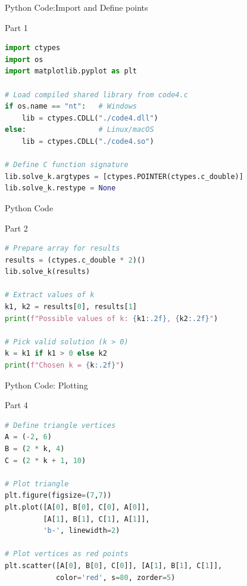 \documentclass{beamer}
\begin{document}
\begin{frame}[fragile]{Python Code:Import and Define points}
\begin{block}{Part 1}
\begin{lstlisting}[language=Python, basicstyle=\ttfamily\small, keywordstyle=\color{blue}, frame=single]
import ctypes
import os
import matplotlib.pyplot as plt

# Load compiled shared library from code4.c
if os.name == "nt":   # Windows
    lib = ctypes.CDLL("./code4.dll")
else:                 # Linux/macOS
    lib = ctypes.CDLL("./code4.so")

# Define C function signature
lib.solve_k.argtypes = [ctypes.POINTER(ctypes.c_double)]
lib.solve_k.restype = None
\end{lstlisting}
\end{block}
\end{frame}


\begin{frame}[fragile]{Python Code}
\begin{block}{Part 2}
\begin{lstlisting}[language=Python, basicstyle=\ttfamily\small, keywordstyle=\color{blue}, frame=single]
# Prepare array for results
results = (ctypes.c_double * 2)()
lib.solve_k(results)

# Extract values of k
k1, k2 = results[0], results[1]
print(f"Possible values of k: {k1:.2f}, {k2:.2f}")

# Pick valid solution (k > 0)
k = k1 if k1 > 0 else k2
print(f"Chosen k = {k:.2f}")
\end{lstlisting}
\end{block}
\end{frame}

\begin{frame}[fragile]{Python Code: Plotting}
\begin{block}{Part 4}
\begin{lstlisting}[language=Python, basicstyle=\ttfamily\small, keywordstyle=\color{blue}, frame=single]
 # Define triangle vertices
A = (-2, 6)
B = (2 * k, 4)
C = (2 * k + 1, 10)

# Plot triangle
plt.figure(figsize=(7,7))
plt.plot([A[0], B[0], C[0], A[0]],
         [A[1], B[1], C[1], A[1]],
         'b-', linewidth=2)

# Plot vertices as red points
plt.scatter([A[0], B[0], C[0]], [A[1], B[1], C[1]],
            color='red', s=80, zorder=5)
\end{lstlisting}
\end{block}
\end{frame}
\end{document}
